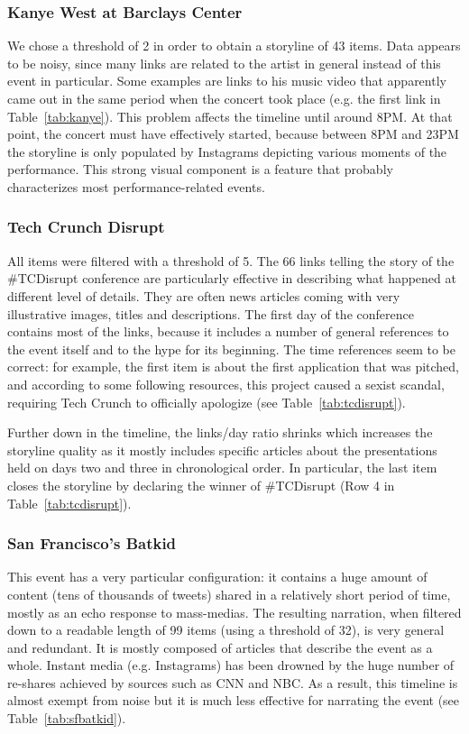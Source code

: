 \documentclass{sig-alternate}
\begin{document}
\subsubsection{Kanye West at Barclays Center}
We chose a threshold of 2 in order to obtain a storyline of 43 items. Data appears to be noisy, since many links are related to the artist in general instead of this event in particular. Some examples are links to his music video that apparently came out in the same period when the concert took place (e.g. the first link in Table~\ref{tab:kanye}). This problem affects the timeline until around 8PM. At that point, the concert must have effectively started, because between 8PM and 23PM the storyline is only populated by Instagrams depicting various moments of the performance. This strong visual component is a feature that probably characterizes most performance-related events.

\subsubsection{Tech Crunch Disrupt}
All items were filtered with a threshold of 5. The 66 links telling the story of the \#TCDisrupt conference are particularly effective in describing what happened at different level of details. They are often news articles coming with very illustrative images, titles and descriptions. The first day of the conference contains most of the links, because it includes a number of general references to the event itself and to the hype for its beginning. The time references seem to be correct: for example, the first item is about the first application that was pitched, and according to some following resources, this project caused a sexist scandal, requiring Tech Crunch to officially apologize (see Table~\ref{tab:tcdisrupt}).

Further down in the timeline, the links/day ratio shrinks which increases the storyline quality as it mostly includes specific articles about the presentations held on days two and three in chronological order. In particular, the last item closes the storyline by declaring the winner of \#TCDisrupt (Row 4 in Table~\ref{tab:tcdisrupt}).

\subsubsection{San Francisco's Batkid}
This event has a very particular configuration: it contains a huge amount of content (tens of thousands of tweets) shared in a relatively short period of time, mostly as an echo response to mass-medias. The resulting narration, when filtered down to a readable length of 99 items (using a threshold of 32), is very general and redundant. It is mostly composed of articles that describe the event as a whole. Instant media (e.g. Instagrams) has been drowned by the huge number of re-shares achieved by sources such as CNN and NBC. As a result, this timeline is almost exempt from noise but it is much less effective for narrating the event (see Table~\ref{tab:sfbatkid}).
\end{document}
